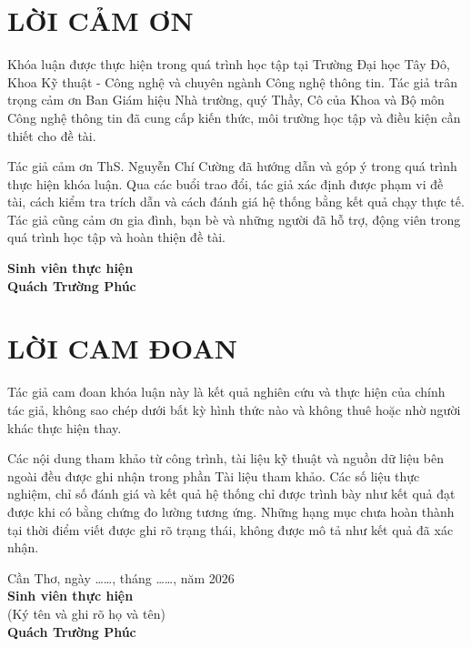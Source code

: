 \documentclass[12pt,a4paper,oneside]{report}
\newcommand{\StudentName}{Quách Trường Phúc}
\newcommand{\ReportYear}{2026}
\begin{document}
\restoregeometry

\clearpage
{}
\setcounter{page}{1}

\chapter*{LỜI CẢM ƠN}
\justifying
Khóa luận được thực hiện trong quá trình học tập tại Trường Đại học Tây Đô, Khoa Kỹ thuật - Công nghệ và chuyên ngành Công nghệ thông tin. Tác giả trân trọng cảm ơn Ban Giám hiệu Nhà trường, quý Thầy, Cô của Khoa và Bộ môn Công nghệ thông tin đã cung cấp kiến thức, môi trường học tập và điều kiện cần thiết cho đề tài.

Tác giả cảm ơn ThS. Nguyễn Chí Cường đã hướng dẫn và góp ý trong quá trình thực hiện khóa luận. Qua các buổi trao đổi, tác giả xác định được phạm vi đề tài, cách kiểm tra trích dẫn và cách đánh giá hệ thống bằng kết quả chạy thực tế. Tác giả cũng cảm ơn gia đình, bạn bè và những người đã hỗ trợ, động viên trong quá trình học tập và hoàn thiện đề tài.

\begin{flushright}
  \textbf{Sinh viên thực hiện}\\[1.7cm]
  \textbf{\StudentName}
\end{flushright}

\clearpage
\chapter*{LỜI CAM ĐOAN}
Tác giả cam đoan khóa luận này là kết quả nghiên cứu và thực hiện của chính tác giả, không sao chép dưới bất kỳ hình thức nào và không thuê hoặc nhờ người khác thực hiện thay.

Các nội dung tham khảo từ công trình, tài liệu kỹ thuật và nguồn dữ liệu bên ngoài đều được ghi nhận trong phần Tài liệu tham khảo. Các số liệu thực nghiệm, chỉ số đánh giá và kết quả hệ thống chỉ được trình bày như kết quả đạt được khi có bằng chứng đo lường tương ứng. Những hạng mục chưa hoàn thành tại thời điểm viết được ghi rõ trạng thái, không được mô tả như kết quả đã xác nhận.

\begin{flushright}
  Cần Thơ, ngày \ldots\ldots, tháng \ldots\ldots, năm \ReportYear\\[0.4cm]
  \textbf{Sinh viên thực hiện}\\
  (Ký tên và ghi rõ họ và tên)\\[1.7cm]
  \textbf{\StudentName}
\end{flushright}
\end{document}

